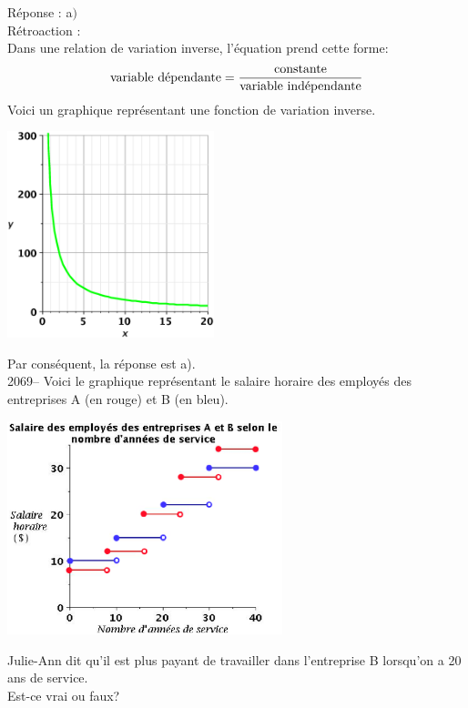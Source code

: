 \documentclass[letterpaper, 12pt]{article}
\begin{document}
R\'eponse : a$)$\\

R\'etroaction :\\
Dans une relation de variation inverse, l'\'equation prend cette forme: \\
\begin{equation*}
\textrm{variable d\'ependante} = \frac{\textrm{constante}}{\textrm{variable ind\'ependante}}\\
\end{equation*}
Voici un graphique repr\'esentant une fonction de variation inverse.
\begin{center}
 \includegraphics[width=6cm,bb=20 118 575 673]{Q2068.eps}
\end{center}
Par cons\'equent, la r\'eponse est a).\\

2069-- Voici le graphique repr\'esentant le salaire horaire des employ\'es des entreprises A (en rouge) et B (en bleu).
\begin{center}
 \includegraphics[width=8cm]{Q2069.eps}
\end{center}
Julie-Ann dit qu'il est plus payant de travailler dans l'entreprise B lorsqu'on a 20 ans de service.\\
Est-ce vrai ou faux?\\
\end{document}
